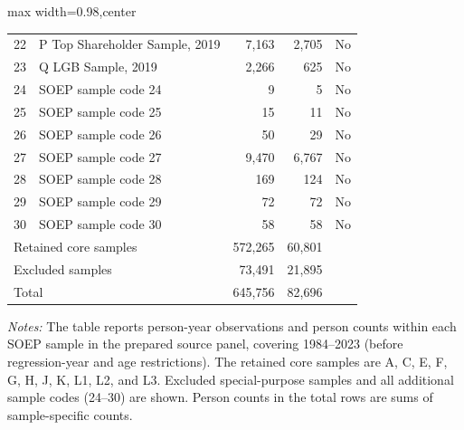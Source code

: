\begin{table}[!htbp]
\begin{adjustbox}{max width=0.98\textwidth,center}
\begin{tabular}{clrrc}
22 & P Top Shareholder Sample, 2019 & 7,163 & 2,705 & No \\
23 & Q LGB Sample, 2019 & 2,266 & 625 & No \\
24 & SOEP sample code 24 & 9 & 5 & No \\
25 & SOEP sample code 25 & 15 & 11 & No \\
26 & SOEP sample code 26 & 50 & 29 & No \\
27 & SOEP sample code 27 & 9,470 & 6,767 & No \\
28 & SOEP sample code 28 & 169 & 124 & No \\
29 & SOEP sample code 29 & 72 & 72 & No \\
30 & SOEP sample code 30 & 58 & 58 & No \\
\midrule
\multicolumn{2}{l}{Retained core samples} & 572,265 & 60,801 &  \\
\multicolumn{2}{l}{Excluded samples} & 73,491 & 21,895 &  \\
\multicolumn{2}{l}{Total} & 645,756 & 82,696 &  \\
\bottomrule
\end{tabular}
\end{adjustbox}
\vspace{0.45em}
\begin{minipage}{0.98\textwidth}
\footnotesize
\emph{Notes:} The table reports person-year observations and person counts within each SOEP sample in the prepared source panel, covering 1984--2023 (before regression-year and age restrictions). 
The retained core samples are A, C, E, F, G, H, J, K, L1, L2, and L3. 
Excluded special-purpose samples and all additional sample codes (24--30) are shown. Person counts in the total rows are sums of sample-specific counts. 
\end{minipage}
\endgroup
\end{table}
